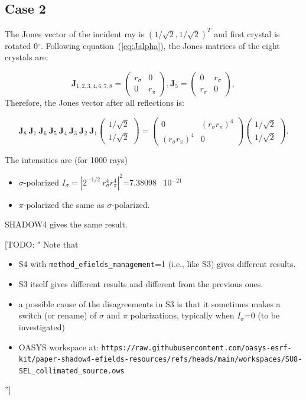 \documentclass{iucr}
\newcommand{\todo}[1]{{\color{red}[TODO: "#1'']}}
\begin{document}
\subsection{Case 2}
The Jones vector of the incident ray is $(1/\sqrt{2},1/\sqrt{2})^T$ and first crystal is rotated 0$^\circ$. Following equation~(\ref{eq:Jalpha}), the Jones matrices of the eight crystals are: 

\begin{equation}\label{eq:Jcase2}
\textbf{J}_{1,2,3,4,6,7,8}=
    \begin{pmatrix}
r_\sigma & 0\\
0& 
r_\pi
\end{pmatrix},
\textbf{J}_{5}=
    \begin{pmatrix}
0 & r_\sigma\\ 
r_\pi & 0\end{pmatrix},
\end{equation}
Therefore, the Jones vector after all reflections is:

\begin{equation}\label{eq:JVcase2}
\textbf{J}_8~\textbf{J}_7~\textbf{J}_6~\textbf{J}_5~\textbf{J}_4~\textbf{J}_3~\textbf{J}_2~\textbf{J}_1
    \begin{pmatrix}
    1/\sqrt{2}\\1/\sqrt{2}
    \end{pmatrix}=
\begin{pmatrix}
  0 & (r_\sigma r_\pi)^4 \\
  (r_\sigma r_\pi)^4 & 0
\end{pmatrix}    \begin{pmatrix}
    1/\sqrt{2}\\1/\sqrt{2}
    \end{pmatrix}.
\end{equation}

The intensities are (for 1000 rays)
\begin{itemize}
    \item $\sigma$-polarized $I_\sigma=|2^{-1/2}~r_\sigma^4 r_\pi^4|^2$=7.38098~ 10$^{-21}$
    \item $\pi$-polarized the same as $\sigma$-polarized.
\end{itemize}

SHADOW4 gives the same result.

\todo{
Note that 
\begin{itemize}
    \item S4 with {\tt method\_efields\_management}=1 (i.e., like S3) gives different results. 
    \item S3 itself gives different results and different from the previous ones.
    \item a possible cause of the disagreements in S3 is that it sometimes makes a switch (or rename) of $\sigma$ and $\pi$ polarizations, typically when $I_\sigma$=0 (to be investigated)
    \item OASYS workspace at: {\tt https://raw.githubusercontent.com/oasys-esrf-kit/paper-shadow4-efields-resources/refs/heads/main/workspaces/SU8-SEL\_collimated\_source.ows} 
\end{itemize}
}
\end{document}
